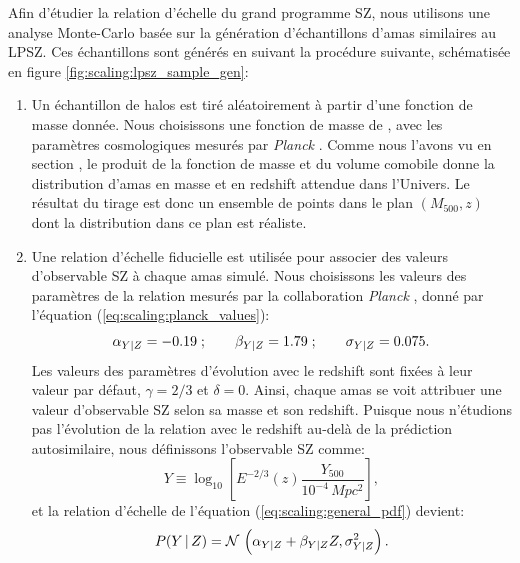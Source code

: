 Afin d'étudier la relation d'échelle du grand programme SZ, nous utilisons une analyse Monte-Carlo basée sur la génération d'échantillons d'amas similaires au LPSZ.
Ces échantillons sont générés en suivant la procédure suivante, schématisée en figure \ref{fig:scaling:lpsz_sample_gen}:
\begin{enumerate}[leftmargin=*]
    \item Un échantillon de halos est tiré aléatoirement à partir d'une fonction de masse donnée.
        Nous choisissons une fonction de masse de , avec les paramètres cosmologiques mesurés par \textit{Planck} \cite{planck_collaboration_planck_2020}.
        Comme nous l'avons vu en section , le produit de la fonction de masse et du volume comobile donne la distribution d'amas en masse et en redshift attendue dans l'Univers.
        Le résultat du tirage est donc un ensemble de points dans le plan $(M_{500}, z)$ dont la distribution dans ce plan est réaliste.
    \item Une relation d'échelle fiducielle est utilisée pour associer des valeurs d'observable SZ à chaque amas simulé.
        Nous choisissons les valeurs des paramètres de la relation mesurés par la collaboration \textit{Planck} \cite{planck_collaboration_planck_2011,planck_collaboration_planck_2014}, donné par l'équation (\ref{eq:scaling:planck_values}):
        \begin{equation}
            \alpha_{Y|Z} = -0.19\;; \qquad \beta_{Y|Z} = 1.79\;; \qquad \sigma_{Y|Z} = 0.075.
        \end{equation}
        Les valeurs des paramètres d'évolution avec le redshift sont fixées à leur valeur par défaut, $\gamma = 2/3$ et $\delta = 0$.
        Ainsi, chaque amas se voit attribuer une valeur d'observable SZ selon sa masse et son redshift.
        Puisque nous n'étudions pas l'évolution de la relation avec le redshift au-delà de la prédiction autosimilaire, nous définissons l'observable SZ comme:
        \begin{equation}
            Y \equiv \log_{10} \left[E^{-2/3}(z) \frac{Y_{500}}{10^{-4} \,\unit{Mpc^2}}\right],
        \end{equation}
        et la relation d'échelle de l'équation (\ref{eq:scaling:general_pdf}) devient:
        \begin{equation}
            \label{eq:scaling:general_pdf_noz}
            P({Y\,|\,Z}) = \mathcal{N}\, \left(\alpha_{Y|Z} + \beta_{Y|Z} Z, \sigma_{Y|Z}^2 \right).
        \end{equation}

\end{enumerate}
